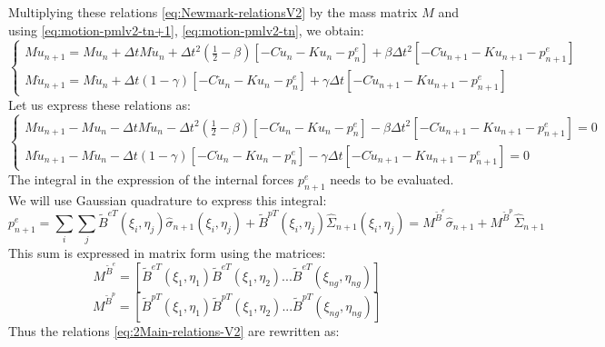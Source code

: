 Multiplying these relations \ref{eq:Newmark-relationsV2} by the mass matrix $M$ and using \ref{eq:motion-pmlv2-tn+1}, \ref{eq:motion-pmlv2-tn}, we obtain:
\begin{equation}
	\begin{cases}
		M u_{n+1} = M u_n + \Delta t M \dot{u}_n + \Delta t^2 \left(\frac{1}{2}-\beta\right) \left[ - C \dot{u}_{n} 
-K u_{n} - p^e_{n}\right] + \beta \Delta t^2 \left[-C \dot{u}_{n+1} 
-K u_{n+1} - p^e_{n+1}\right]  \\
		M \dot{u}_{n+1} = M \dot{u}_n + \Delta t (1-\gamma) \left[ - C \dot{u}_{n} 
-K u_{n} - p^e_{n}\right] + \gamma \Delta t \left[-C \dot{u}_{n+1} 
-K u_{n+1} - p^e_{n+1}\right]
	\end{cases}
	\label{eq:Main-relations-V2}
\end{equation}
Let us express these relations as:
\begin{equation}
	\begin{cases}
		M u_{n+1} - M u_n - \Delta t M \dot{u}_n - \Delta t^2 \left(\frac{1}{2}-\beta\right) \left[ - C \dot{u}_{n} 
-K u_{n} - p^e_{n}\right] - \beta \Delta t^2 \left[-C \dot{u}_{n+1} 
-K u_{n+1} - p^e_{n+1}\right] = 0  \\
		M \dot{u}_{n+1} - M \dot{u}_n - \Delta t (1-\gamma) \left[ - C \dot{u}_{n} 
-K u_{n} - p^e_{n}\right] - \gamma \Delta t \left[-C \dot{u}_{n+1} 
-K u_{n+1} - p^e_{n+1}\right] = 0
	\end{cases}
	\label{eq:2Main-relations-V2}
\end{equation}
The integral in the expression of the internal forces $p^e_{n+1}$ needs to be evaluated. We will use Gaussian quadrature to express this integral:
\begin{equation}
p^e_{n+1} = \sum_i \sum_j \tilde{B}^{eT}(\xi_i,\eta_j)  \hat{\sigma}_{n+1}(\xi_i,\eta_j) + \tilde{B}^{pT}(\xi_i,\eta_j)  \hat{\Sigma}_{n+1}(\xi_i,\eta_j) = M^{\tilde{B}^{e}} \hat{\sigma}_{n+1} + M^{\tilde{B}^{p}}\hat{\Sigma}_{n+1}
\end{equation} 
This sum is expressed in matrix form using the matrices:
\begin{equation}
M^{\tilde{B}^{e}} = [\tilde{B}^{eT}(\xi_1,\eta_1) \tilde{B}^{eT}(\xi_1,\eta_2) ... \tilde{B}^{eT}(\xi_{ng},\eta_{ng})]
\end{equation}
\begin{equation}
M^{\tilde{B}^{p}} = [\tilde{B}^{pT}(\xi_1,\eta_1) \tilde{B}^{pT}(\xi_1,\eta_2) ... \tilde{B}^{pT}(\xi_{ng},\eta_{ng})]
\end{equation}
Thus the relations \ref{eq:2Main-relations-V2} are rewritten as: 
